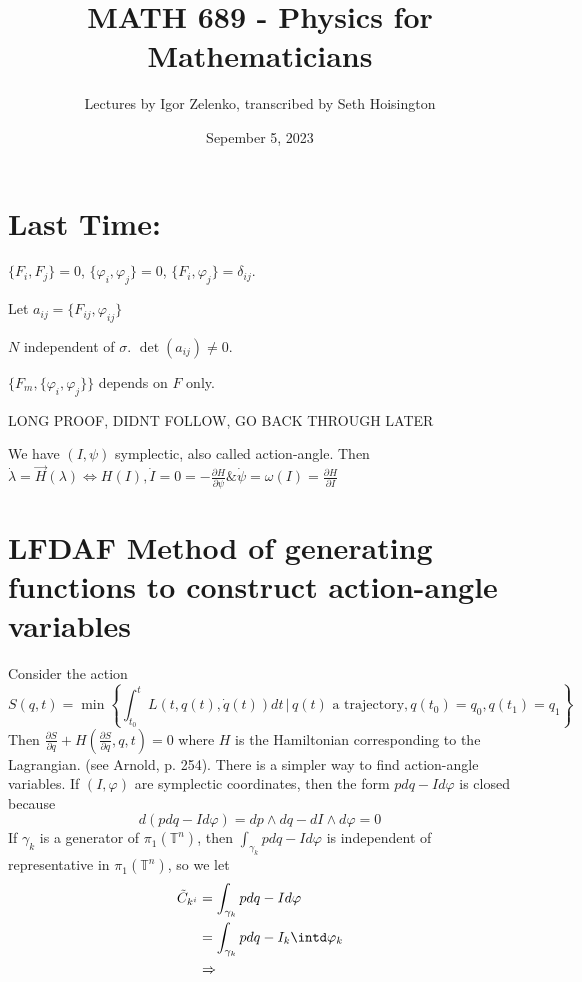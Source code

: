 \documentclass{article}
\title{MATH 689 - Physics for Mathematicians}
\author{Lectures by Igor Zelenko, transcribed by Seth Hoisington}
\date{Sepember 5, 2023}
\newcommand{\nl}{\newline\newline\noindent}
\newcommand{\vhi}{\varphi}
\newcommand{\w}{\omega}
\newcommand{\pdof}[2]{\frac{\partial #1}{\partial #2}}
\begin{document}
\maketitle
\section*{Last Time:}
$\{F_i,F_j\} = 0$, $\{\vhi_i,\vhi_j\} = 0$, $\{F_i,\vhi_j\} = \delta_{ij}$.

Let $a_{ij} = \{F_{ij},\vhi_{ij}\}$

$N$ independent of $\sigma$. $\det(a_{ij}) \neq 0$.

$\{F_m, \{\vhi_i,\vhi_j\}\}$ depends on $F$ only.


LONG PROOF, DIDNT FOLLOW, GO BACK THROUGH LATER

We have $(I,\psi)$ symplectic, also called action-angle. Then $\dot\lambda = \vec H(\lambda)\Leftrightarrow H(I), \dot I = 0 = -\pdof{H}{\psi} \& \dot\psi = \w(I) = \pdof{H}{I}$
\section*{LFDAF Method of generating functions to construct action-angle variables}
Consider the action
\[S(q,t) = \min\left\{\int_{t_0}^tL(t,q(t),\dot q(t))dt\,\big|\,\text{$q(t)$ a trajectory}, q(t_0) = q_0,q(t_1) = q_1\right\}\]
Then $\pdof{S}{q} + H\left(\pdof{S}{q},q,t\right) = 0$ where $H$ is the Hamiltonian corresponding to the Lagrangian. (see Arnold, p. 254).
\nl
There is a simpler way to find action-angle variables. If $(I,\vhi)$ are symplectic coordinates, then the form $pdq - Id\vhi$ is closed because 
\[d(pdq - Id\vhi) = dp\wedge dq - dI\wedge d\vhi = 0\]
If $\gamma_k$ is a generator of $\pi_1(\mathbb{T}^n)$, then
$\int_{\gamma_k}pdq - Id\vhi$ is independent of representative in $\pi_1(\mathbb{T}^n)$, so we let
\begin{align*}
    \tilde C_{k^i} &= \int_{\gamma_k}pdq - Id\vhi\\
    &=\int_{\gamma_k}pdq - I_k\intd\vhi_k\\
    &\Rightarrow 
\end{align*}
\end{document}
